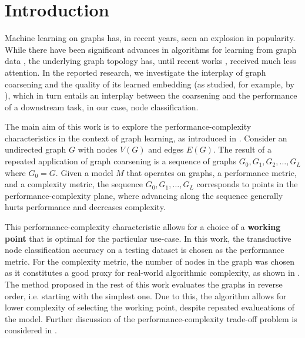 \section{Introduction}\label{sec:introduction}
Machine learning on graphs has, in recent years, seen an explosion in popularity. While there have been significant advances in algorithms for learning from graph data \cite{defferrard_convolutional_2016,kipf_semi-supervised_2017}, the underlying graph topology has, until recent works \cite{topping_understanding_2021,velickovic_geometric_2021}, received much less attention. In the reported research, we investigate the interplay of graph coarsening and the quality of its learned embedding (as studied, for example, by \cite{akyildiz_understanding_2020,makarov_survey_2021}), which in turn entails an interplay between the coarsening and the performance of a downstream task, in our case, node classification.

The main aim of this work is to explore the performance-complexity characteristics in the context of graph learning, as introduced in \cite{prochazka_downstream_2022}. Consider an undirected graph \( G \) with nodes \( V \left( G \right) \) and edges \( E \left( G \right) \). The result of a repeated application of graph coarsening is a sequence of graphs \( G_0, G_1, G_2, \dots, G_L \) where \( G_0 = G \).
Given a model \( M \) that operates on graphs, a performance metric, and a complexity metric, the sequence \( G_0, G_1, \dots, G_L \) corresponds to points in the performance-complexity plane, where advancing along the sequence generally hurts performance and decreases complexity.

This performance-complexity characteristic allows for a choice of a \textbf{working point} that is optimal for the particular use-case. In this work, the transductive node classification accuracy on a testing dataset is chosen as the performance metric. For the complexity metric, the number of nodes in the graph was chosen as it constitutes a good proxy for real-world algorithmic complexity, as shown in \cite{chiang_cluster-gcn_2019}. The method proposed in the rest of this work evaluates the graphs in reverse order, i.e. starting with the simplest one. Due to this, the algorithm allows for lower complexity of selecting the working point, despite repeated evalueations of the model. Further discussion of the performance-complexity trade-off problem is considered in \cite{prochazka_downstream_2022}.
